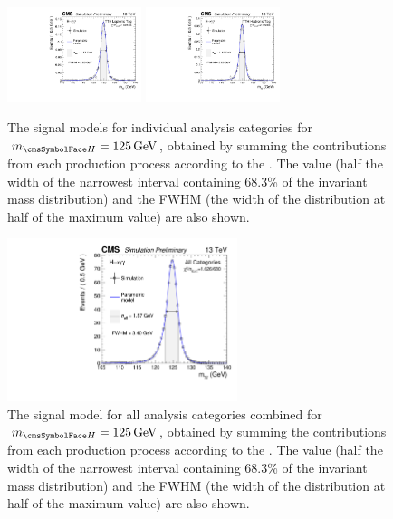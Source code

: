 \begin{figure}[ht!]
\includegraphics[width=0.35\textwidth]{modellingFigures/DCBpG/TTHLeptonicTag.pdf} 
\includegraphics[width=0.35\textwidth]{modellingFigures/DCBpG/TTHHadronicTag.pdf} 

\caption{The signal models for individual analysis categories for $\mH=125\GeV$, obtained by summing the contributions from each production process according to the \effxacc. The \effSigma value (half the width of the narrowest interval containing 68.3\% of the invariant mass distribution) and the FWHM (the width of the distribution at half of the maximum value) are also shown.}

\label{fig:model:sig_model_per_category}
\end{figure}

\begin{figure}[ht!]
\centering
\includegraphics[width=0.6\textwidth]{modellingFigures/DCBpG/all.pdf} 

\caption{The signal model for all analysis categories combined for $\mH=125\GeV$, obtained by summing the contributions from each production process according to the \effxacc. The \effSigma value (half the width of the narrowest interval containing 68.3\% of the invariant mass distribution) and the FWHM (the width of the distribution at half of the maximum value) are also shown. }

\label{fig:model:sig_model_all}
\end{figure}


